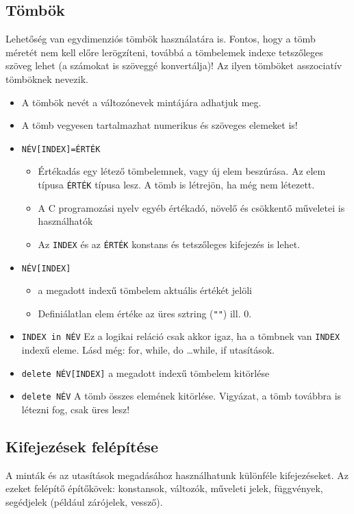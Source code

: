 \subsection{Tömbök}

Lehetőség van egydimenziós tömbök használatára is. Fontos, hogy a tömb méretét nem kell előre lerögzíteni, továbbá a tömbelemek 
indexe tetszőleges szöveg lehet (a számokat is szöveggé konvertálja)! Az ilyen tömböket asszociatív tömböknek nevezik.
\begin{itemize}
\item  A tömbök nevét a változónevek mintájára adhatjuk meg.
\item  A tömb vegyesen tartalmazhat numerikus és szöveges elemeket is!
\item  \texttt{NÉV[INDEX]=ÉRTÉK}\hfill
	\begin{itemize}
	\item Értékadás egy létező tömbelemnek, vagy új elem beszúrása. 
	Az elem típusa \texttt{ÉRTÉK} típusa lesz. A tömb is létrejön, ha még nem létezett.
	\item A C programozási nyelv egyéb értékadó, növelő és csökkentő műveletei is használhatók
	\item Az \texttt{INDEX} és az \texttt{ÉRTÉK} konstans és tetszőleges kifejezés is lehet.
	\end{itemize}
\item  \texttt{NÉV[INDEX]}\hfill
	\begin{itemize}
	\item a megadott indexű tömbelem aktuális értékét jelöli
	\item Definiálatlan elem értéke az üres sztring (\verb."".) ill. 0.
	\end{itemize}
\item \texttt{INDEX in NÉV} Ez a logikai reláció csak akkor igaz, ha a tömbnek van
	\texttt{INDEX} indexű eleme. Lásd még: for, while, do \dots while, if utasítások.
\item \texttt{delete NÉV[INDEX]} a megadott indexű tömbelem kitörlése
\item \texttt{delete NÉV} A tömb összes elemének kitörlése. Vigyázat, a tömb
	továbbra is létezni fog, csak üres lesz!
\end{itemize}

\subsection{Kifejezések felépítése}

A minták és az utasítások megadásához használhatunk különféle
kifejezéseket. Az ezeket felépítő építőkövek: konstansok,
változók, műveleti jelek, függvények, segédjelek (például zárójelek, vessző).

